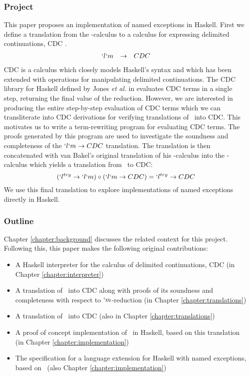 \subsubsection{Project}
This paper proposes an implementation of named exceptions in Haskell.
First we define a translation from the \lmu-calculus to a calculus for expressing delimited continuations, CDC \cite{JonesDS07}.
\[
\begin{array}{lcr}
  `l`m & \to & CDC
\end{array}
\]
CDC is a calculus which closely models Haskell's syntax and which has been extended with operations for manipulating delimited continuations.
The CDC library for Haskell defined by Jones \emph{et al.} in \cite{JonesDS07} evaluates CDC terms in a single step, returning the final value of the reduction.
However, we are interested in producing the entire step-by-step evaluation of CDC terms which we can transliterate into CDC derivations for verifying translations of \lmu\ into CDC.
This motivates us to write a term-rewriting program for evaluating CDC terms.
The proofs generated by this program are used to investigate the soundness and completeness of the $`l`m \to CDC$ translation.
The translation is then concatenated with van Bakel's original translation of his \ltry-calculus into the \lmu-calculus which yields a translation from \ltry\ to CDC:
\[
   (`l^{try} \to `l`m) \circ (`l`m \to CDC) = `l^{try} \to CDC
\]
We use this final translation to explore implementations of named exceptions directly in Haskell.

\subsubsection{Outline}
Chapter \ref{chapter:background} discusses the related context for this project. Following this, this paper makes the following original contributions:
\begin{itemize}
\item A Haskell interpreter for the calculus of delimited continuations, CDC (in Chapter \ref{chapter:interpreter})
\item A translation of \lmu\ into CDC along with proofs of its soundness and completeness with respect to $`m$-reduction (in Chapter \ref{chapter:translations})
\item A translation of \ltry\ into CDC (also in Chapter \ref{chapter:translations}) 
\item A proof of concept implementation of \ltry\ in Haskell, based on this translation (in Chapter \ref{chapter:implementation})
\item The specification for a language extension for Haskell with named exceptions, based on \ltry\ (also Chapter \ref{chapter:implementation})
\end{itemize}
